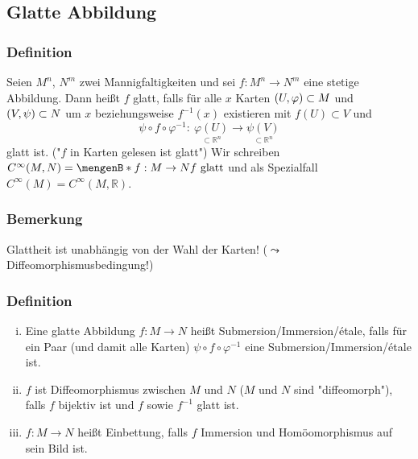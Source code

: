
\subsection{Glatte Abbildung}
\label{sub:13}

\subsubsection[Definition: Glatte Funktionen zwischen zwei Mannigfaltigkeiten]{Definition}
\label{ssub:117}

Seien $M^n$, $N^m$ zwei Mannigfaltigkeiten und sei $f:M^n\to N^m$ eine stetige Abbildung. Dann heißt $f$ glatt, falls für alle $x$ Karten $(U,\varphi) \subset M$ und $(V,\psi) \subset N$ um $x$ beziehungsweise $f^{-1}(x)$ existieren mit $f(U)\subset V$ und 
\[
	\psi \circ f \circ \varphi^{-1}:\ \underset{\subset \mathds{R}^n}{\varphi(U)} \to \underset{\subset \mathds{R}^n}{\psi(V)}
\]
glatt ist. ("$f$ in Karten gelesen ist glatt")
Wir schreiben $C^{\infty}(M,N) = \set[f:M\to N]{f\ \text{glatt}}$ und als Spezialfall $C^{\infty}(M) = C^{\infty}(M,\mathds{R})$.

\subsubsection{Bemerkung}
\label{ssub:118}
Glattheit ist unabhängig von der Wahl der Karten! ($\leadsto$ Diffeomorphismusbedingung!)

\subsubsection{Definition}
\label{ssub:119}
\begin{enumerate}[(i)]
\item Eine glatte Abbildung $f:M\to N$ heißt Submersion/Immersion/étale, falls für ein Paar (und damit alle Karten) $\psi \circ f \circ \varphi^{-1}$ eine Submersion/Immersion/étale ist.
\item $f$ ist Diffeomorphismus zwischen $M$ und $N$ ($M$ und $N$ sind "diffeomorph"), falls $f$ bijektiv ist und $f$ sowie $f^{-1}$ glatt ist.
\item $f:M\to N$ heißt Einbettung, falls $f$ Immersion und Homöomorphismus auf sein Bild ist.
\end{enumerate}

